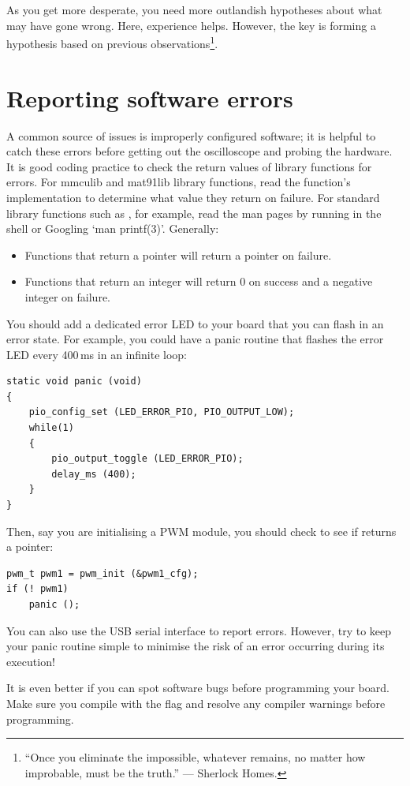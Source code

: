 As you get more desperate, you need more outlandish hypotheses about
what may have gone wrong.  Here, experience helps.  However, the key
is forming a hypothesis based on previous observations\footnote{``Once
  you eliminate the impossible, whatever remains, no matter how
  improbable, must be the truth.'' --- Sherlock Homes.}.


\section{Reporting software errors}
\label{reporting-software-errors}

A common source of issues is improperly configured software; it is
helpful to catch these errors before getting out the oscilloscope and
probing the hardware. It is good coding practice to check the return
values of library functions for errors. For mmculib and mat91lib
library functions, read the function's implementation to determine
what value they return on failure. For standard library functions such
as , for example, read the man pages by running  in the shell or Googling `man printf(3)'. Generally:
\begin{itemize}
\item Functions that return a pointer will return a 
pointer on failure.
\item Functions that return an integer will return 0 on success and a
negative integer on failure.
\end{itemize}

You should add a dedicated error LED to your board that you can flash
in an error state. For example, you could have a panic routine that
flashes the error LED every 400\,ms in an infinite loop:
\begin{verbatim}
static void panic (void)
{
    pio_config_set (LED_ERROR_PIO, PIO_OUTPUT_LOW);
    while(1)
    {
        pio_output_toggle (LED_ERROR_PIO);
        delay_ms (400);
    }
}
\end{verbatim}
Then, say you are initialising a PWM module, you should check to see
if  returns a  pointer:
\begin{verbatim}
pwm_t pwm1 = pwm_init (&pwm1_cfg);
if (! pwm1)
    panic ();
\end{verbatim}
You can also use the USB serial interface to report errors. However,
try to keep your panic routine simple to minimise the risk of an error
occurring during its execution!

It is even better if you can spot software bugs before programming
your board. Make sure you compile with the  flag and
resolve any compiler warnings before programming.

